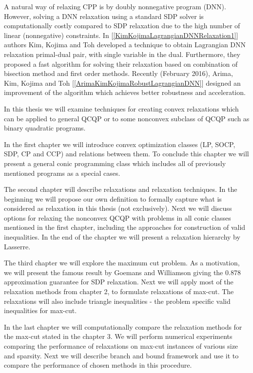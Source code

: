 \documentclass[12pt]{book}
\theoremstyle{definition}
\begin{document}
A natural way of relaxing CPP is by doubly nonnegative program (DNN).
However, solving a DNN relaxation using a standard SDP solver is computationally costly compared to SDP relaxation due to the high number of linear (nonnegative) constraints. In [\ref{KimKojimaLagrangianDNNRelaxation1}] authors Kim, Kojima and Toh developed a technique to obtain Lagrangian DNN relaxation primal-dual pair, with single variable in the dual. Furthermore, they proposed a fast algorithm for solving their relaxation based on combination of bisection method and first order methods. Recently (February 2016), Arima, Kim, Kojima and Toh [\ref{ArimaKimKojimaRobustLagrangianDNN}] designed an improvement of the algorithm which achieves better robustness and acceleration. %

\bigskip
In this thesis we will examine techniques for creating convex relaxations which can be applied to general QCQP or to some nonconvex subclass of QCQP such as binary quadratic programs. 

In the first chapter we will introduce convex optimization classes (LP, SOCP, SDP, CP and CCP) and relations between them. To conclude this chapter we will present a general conic programming class which includes all of previously mentioned programs as a special cases. 

The second chapter will describe relaxations and relaxation techniques. In the beginning we will propose our own definition to formally capture what is considered as relaxation in this thesis (not exclusively). Next we will discuss options for relaxing the nonconvex QCQP with problems in all conic classes mentioned in the first chapter, including the approaches for construction of valid inequalities. In the end of the chapter we will present a relaxation hierarchy by Lasserre.

The third chapter we will explore the maximum cut problem. As a motivation, we will present the famous result by Goemans and Williamson giving the 0.878 approximation guarantee for SDP relaxation. Next we will apply most of the relaxation methods from chapter 2, to formulate relaxations of max-cut. The relaxations will also include triangle inequalities - the problem specific valid inequalities for max-cut.

In the last chapter we will computationally compare the relaxation methods for the max-cut stated in the chapter 3.  We will perform numerical experiments comparing the performance of relaxations on max-cut instances of various size and sparsity. Next we will describe branch and bound framework and use it to compare the performance of chosen methods in this procedure.
\end{document}
